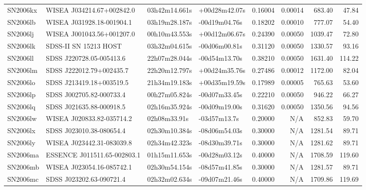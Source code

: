 \begin{longtable}{llllrrrr}
SN2006kx         &       WISEA J034214.67+002842.0 &   03h42m14.661s &   +00d28m42.07s &  0.16004 &  0.00014 &   683.40 &       47.84 \\
SN2006lb         &       WISEA J031928.18-001904.1 &   03h19m28.187s &   -00d19m04.76s &  0.18202 &  0.00010 &   777.07 &       54.40 \\
SN2006lj         &       WISEA J001043.56+001207.0 &   00h10m43.553s &   +00d12m06.67s &  0.24390 &  0.00050 &  1039.47 &       72.80 \\
SN2006lk         &           SDSS-II SN 15213 HOST &   03h32m04.615s &   -00d06m00.81s &  0.31120 &  0.00050 &  1330.57 &       93.16 \\
SN2006ll         &        SDSS J220728.05-005413.6 &   22h07m28.044s &   -00d54m13.70s &  0.38210 &  0.00050 &  1631.40 &      114.22 \\
SN2006lm         &        SDSS J222012.79+002435.7 &   22h20m12.797s &   +00d24m35.76s &  0.27486 &  0.00012 &  1172.00 &       82.04 \\
SN2006lo         &        SDSS J213419.18+003519.5 &   21h34m19.183s &   +00d35m19.59s &  0.17989 &  0.00005 &   765.63 &       53.60 \\
SN2006lp         &        SDSS J002705.82-000733.4 &   00h27m05.824s &   -00d07m33.45s &  0.22210 &  0.00050 &   946.22 &       66.27 \\
SN2006lq         &        SDSS J021635.88-000918.5 &   02h16m35.924s &   -00d09m19.00s &  0.31620 &  0.00050 &  1350.56 &       94.56 \\
SN2006lw         &       WISEA J020833.82-035714.2 &    02h08m33.91s &    -03d57m13.7s &  0.20000 &      N/A &   852.83 &       59.70 \\
SN2006lx         &        SDSS J023010.38-080654.4 &   02h30m10.384s &   -08d06m54.03s &  0.30000 &      N/A &  1281.54 &       89.71 \\
SN2006ly         &       WISEA J023442.31-083039.8 &   02h34m42.323s &   -08d30m39.71s &  0.30000 &      N/A &  1281.62 &       89.71 \\
SN2006ma         &     ESSENCE J011511.65-002803.1 &   01h15m11.653s &   -00d28m03.12s &  0.40000 &      N/A &  1708.59 &      119.60 \\
SN2006mb         &       WISEA J023054.16-085742.1 &   02h30m54.154s &   -08d57m41.85s &  0.30000 &      N/A &  1281.57 &       89.71 \\
SN2006mc         &        SDSS J023202.63-090721.4 &   02h32m02.634s &   -09d07m21.46s &  0.40000 &      N/A &  1709.86 &      119.69 \\

\end{longtable}
